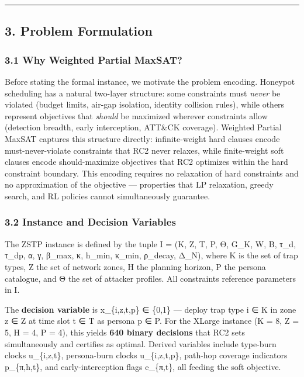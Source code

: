 \documentclass[
  11pt,
]{article}
\begin{document}
\begin{center}\rule{0.5\linewidth}{0.5pt}\end{center}

\hypertarget{problem-formulation}{%
\subsection{3. Problem Formulation}\label{problem-formulation}}

\hypertarget{why-weighted-partial-maxsat}{%
\subsubsection{3.1 Why Weighted Partial
MaxSAT?}\label{why-weighted-partial-maxsat}}

Before stating the formal instance, we motivate the problem encoding.
Honeypot scheduling has a natural two-layer structure: some constraints
must \emph{never} be violated (budget limits, air-gap isolation,
identity collision rules), while others represent objectives that
\emph{should} be maximized wherever constraints allow (detection
breadth, early interception, ATT\&CK coverage). Weighted Partial MaxSAT
captures this structure directly: infinite-weight hard clauses encode
must-never-violate constraints that RC2 never relaxes, while
finite-weight soft clauses encode should-maximize objectives that RC2
optimizes within the hard constraint boundary. This encoding requires no
relaxation of hard constraints and no approximation of the objective ---
properties that LP relaxation, greedy search, and RL policies cannot
simultaneously guarantee.

\hypertarget{instance-and-decision-variables}{%
\subsubsection{3.2 Instance and Decision
Variables}\label{instance-and-decision-variables}}

The ZSTP instance is defined by the tuple I = (K, Z, T, P, Θ, G\_K, W,
B, τ\_d, τ\_dp, α, γ, β\_max, κ, h\_min, κ\_min, ρ\_decay, Δ\_N), where
K is the set of trap types, Z the set of network zones, H the planning
horizon, P the persona catalogue, and Θ the set of attacker profiles.
All constraints reference parameters in I.

The \textbf{decision variable} is x\_\{i,z,t,p\} ∈ \{0,1\} --- deploy
trap type i ∈ K in zone z ∈ Z at time slot t ∈ T as persona p ∈ P. For
the XLarge instance (\textbar K\textbar{} = 8, \textbar Z\textbar{} = 5,
H = 4, \textbar P\textbar{} = 4), this yields \textbf{640 binary
decisions} that RC2 sets simultaneously and certifies as optimal.
Derived variables include type-burn clocks u\_\{i,z,t\}, persona-burn
clocks u\_\{i,z,t,p\}, path-hop coverage indicators p\_\{π,h,t\}, and
early-interception flags e\_\{π,t\}, all feeding the soft objective.
\end{document}
